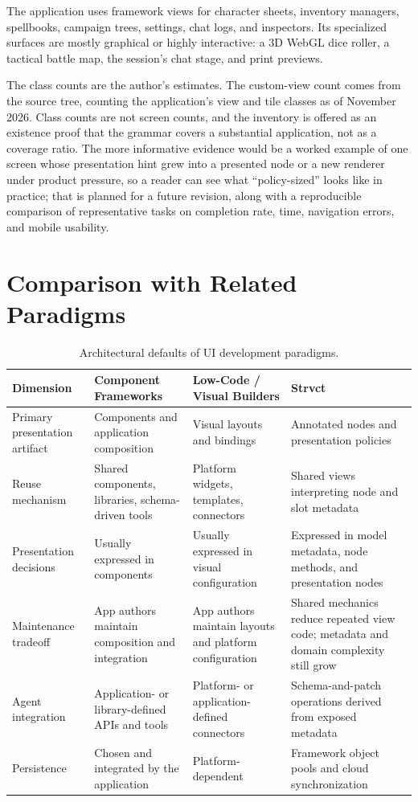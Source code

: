 \documentclass[sigplan,review,anonymous,10pt]{acmart}
\begin{document}
The application uses framework views for character sheets, inventory managers, spellbooks, campaign trees, settings, chat logs, and inspectors. Its specialized surfaces are mostly graphical or highly interactive: a 3D WebGL dice roller, a tactical battle map, the session's chat stage, and print previews.

The class counts are the author's estimates. The custom-view count comes from the source tree, counting the application's view and tile classes as of November 2026. Class counts are not screen counts, and the inventory is offered as an existence proof that the grammar covers a substantial application, not as a coverage ratio. The more informative evidence would be a worked example of one screen whose presentation hint grew into a presented node or a new renderer under product pressure, so a reader can see what ``policy-sized'' looks like in practice; that is planned for a future revision, along with a reproducible comparison of representative tasks on completion rate, time, navigation errors, and mobile usability.

\section{Comparison with Related Paradigms}
\label{sec:related}

\begin{table}[t]
\centering
\small
\begin{tabular}{p{} p{} p{} p{}}
\hline
Dimension & Component Frameworks & Low-Code / Visual Builders & Strvct \\
\hline
Primary presentation artifact & Components and application composition & Visual layouts and bindings & Annotated nodes and presentation policies \\
Reuse mechanism & Shared components, libraries, schema-driven tools & Platform widgets, templates, connectors & Shared views interpreting node and slot metadata \\
Presentation decisions & Usually expressed in components & Usually expressed in visual configuration & Expressed in model metadata, node methods, and presentation nodes \\
Maintenance tradeoff & App authors maintain composition and integration & App authors maintain layouts and platform configuration & Shared mechanics reduce repeated view code; metadata and domain complexity still grow \\
Agent integration & Application- or library-defined APIs and tools & Platform- or application-defined connectors & Schema-and-patch operations derived from exposed metadata \\
Persistence & Chosen and integrated by the application & Platform-dependent & Framework object pools and cloud synchronization \\
\hline
\end{tabular}
\caption{Architectural defaults of UI development paradigms.}
\label{tab:comparison}
\end{table}
\end{document}

